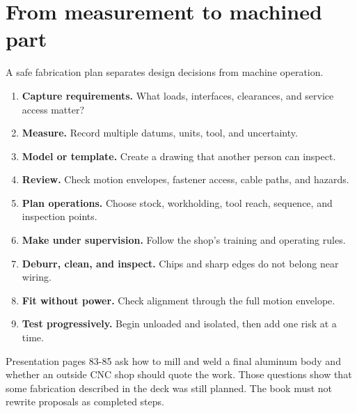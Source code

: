 \documentclass[11pt,openany]{book}
\begin{document}


\chapter{From measurement to machined part}

A safe fabrication plan separates design decisions from machine operation.

\begin{enumerate}
  \item \textbf{Capture requirements.} What loads, interfaces, clearances, and service access matter?
  \item \textbf{Measure.} Record multiple datums, units, tool, and uncertainty.
  \item \textbf{Model or template.} Create a drawing that another person can inspect.
  \item \textbf{Review.} Check motion envelopes, fastener access, cable paths, and hazards.
  \item \textbf{Plan operations.} Choose stock, workholding, tool reach, sequence, and inspection points.
  \item \textbf{Make under supervision.} Follow the shop's training and operating rules.
  \item \textbf{Deburr, clean, and inspect.} Chips and sharp edges do not belong near wiring.
  \item \textbf{Fit without power.} Check alignment through the full motion envelope.
  \item \textbf{Test progressively.} Begin unloaded and isolated, then add one risk at a time.
\end{enumerate}

\begin{fieldnotebox}
Presentation pages 83-85 ask how to mill and weld a final aluminum body and whether an outside CNC shop should quote the work. Those questions show that some fabrication described in the deck was still planned. The book must not rewrite proposals as completed steps.
\end{fieldnotebox}

\end{document}

